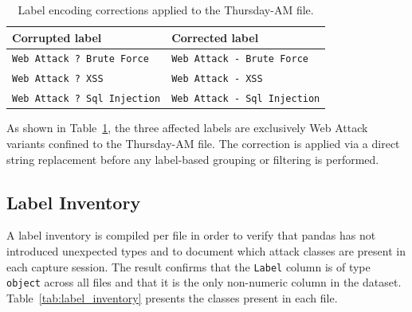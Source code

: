 \documentclass[12pt,a4paper]{article}
\begin{document}
\begin{table}[H]
    \centering
    \caption{Label encoding corrections applied to the Thursday-AM file.}
    \label{tab:label_fixes}
    \begin{tabular}{|l|l|}
        \hline
        \textbf{Corrupted label}            & \textbf{Corrected label}            \\
        \hline
        \texttt{Web Attack ? Brute Force}   & \texttt{Web Attack - Brute Force}   \\
        \hline
        \texttt{Web Attack ? XSS}           & \texttt{Web Attack - XSS}           \\
        \hline
        \texttt{Web Attack ? Sql Injection} & \texttt{Web Attack - Sql Injection} \\
        \hline
    \end{tabular}
\end{table}

As shown in Table~\ref{tab:label_fixes}, the three affected labels are exclusively
Web Attack variants confined to the Thursday-AM file. The correction is applied via
a direct string replacement before any label-based grouping or filtering is performed.

\subsection{Label Inventory}

A label inventory is compiled per file in order to verify that pandas has not
introduced unexpected types and to document which attack classes are present in
each capture session. The result confirms that the \texttt{Label} column is of
type \texttt{object} across all files and that it is the only non-numeric column
in the dataset. Table~\ref{tab:label_inventory} presents the classes present
in each file.
\end{document}
